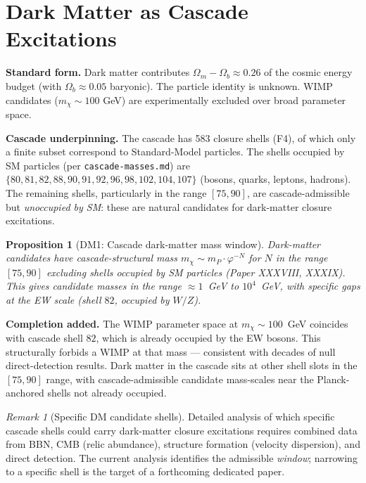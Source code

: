 \documentclass[12pt]{article}
\newtheorem{proposition}[theorem]{Proposition}
\theoremstyle{remark}
\newtheorem{remark}[theorem]{Remark}
\begin{document}
\section{Dark Matter as Cascade Excitations}\label{sec:darkmatter}

\textbf{Standard form.} Dark matter contributes $\Omega_m - \Omega_b \approx 0.26$ of the cosmic energy budget (with $\Omega_b \approx 0.05$ baryonic). The particle identity is unknown. WIMP candidates ($m_\chi \sim 100$ GeV) are experimentally excluded over broad parameter space.

\textbf{Cascade underpinning.} The cascade has 583 closure shells (F4), of which only a finite subset correspond to Standard-Model particles. The shells occupied by SM particles (per \texttt{cascade-masses.md}) are $\{80, 81, 82, 88, 90, 91, 92, 96, 98, 102, 104, 107\}$ (bosons, quarks, leptons, hadrons). The remaining shells, particularly in the range $[75, 90]$, are cascade-admissible but \emph{unoccupied by SM}: these are natural candidates for dark-matter closure excitations.

\begin{proposition}[DM1: Cascade dark-matter mass window]\label{prop:dm-mass}
Dark-matter candidates have cascade-structural mass $m_\chi \sim m_P \cdot \varphi^{-N}$ for $N$ in the range $[75, 90]$ excluding shells occupied by SM particles (Paper XXXVIII, XXXIX). This gives candidate masses in the range $\approx 1$~GeV to $10^4$~GeV, with specific gaps at the EW scale (shell $82$, occupied by $W/Z$).
\end{proposition}

\textbf{Completion added.} The WIMP parameter space at $m_\chi \sim 100$~GeV coincides with cascade shell $82$, which is already occupied by the EW bosons. This structurally forbids a WIMP at that mass --- consistent with decades of null direct-detection results. Dark matter in the cascade sits at other shell slots in the $[75, 90]$ range, with cascade-admissible candidate mass-scales near the Planck-anchored shells not already occupied.

\begin{remark}[Specific DM candidate shells]
Detailed analysis of which specific cascade shells could carry dark-matter closure excitations requires combined data from BBN, CMB (relic abundance), structure formation (velocity dispersion), and direct detection. The current analysis identifies the admissible \emph{window}; narrowing to a specific shell is the target of a forthcoming dedicated paper.
\end{remark}
\end{document}
